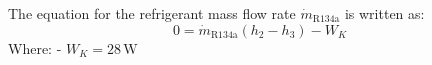 The equation for the refrigerant mass flow rate \( \dot{m}_{\text{R134a}} \) is written as:  
\[
0 = \dot{m}_{\text{R134a}} (h_2 - h_3) - W_K
\]  
Where:  
- \( W_K = 28 \, \text{W} \)